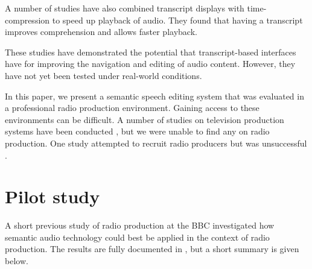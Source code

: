A number of studies \cite{Whittaker2002,Vemuri2004,Ranjan2006} have also
combined transcript displays with time-compression to speed up playback of
audio.  They found that having a transcript improves comprehension and allows
faster playback.





These studies have demonstrated the potential that transcript-based interfaces
have for improving the navigation and editing of audio content. However, they
have not yet been tested under real-world conditions.

In this paper, we present a semantic speech editing system that was evaluated
in a professional radio production environment. Gaining access to these
environments can be difficult. A number of studies on television production
systems have been conducted \cite{Engstroem2010,Perry2009}, but we were unable
to find any on radio production. One study attempted to recruit radio producers
but was unsuccessful \cite{Kim2003}.

\section{Pilot study}
A short previous study of radio production at the BBC investigated how semantic
audio technology could best be applied in the context of radio production.  The
results are fully documented in \cite{Baume2015}, but a short summary is given
below.

